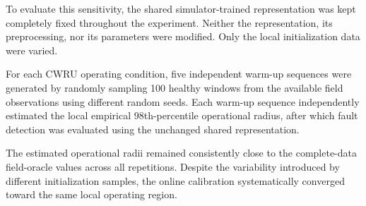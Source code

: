 \documentclass[11pt,a4paper]{article}
\begin{document}
To evaluate this sensitivity, the shared simulator-trained representation was kept completely
fixed throughout the experiment. Neither the representation, its preprocessing, nor its
parameters were modified. Only the local initialization data were varied.

For each CWRU operating condition, five independent warm-up sequences were generated by randomly
sampling 100 healthy windows from the available field observations using different random seeds.
Each warm-up sequence independently estimated the local empirical 98th-percentile operational
radius, after which fault detection was evaluated using the unchanged shared representation.

\begin{table}[H]
\centering
\caption{Robustness of online operational-radius estimation under different random warm-up samples. The shared simulator-trained representation remained fixed throughout the experiment. Only the 100 healthy initialization windows used for local calibration were randomly changed. Values are mean $\pm$ standard deviation over five random seeds.}
\label{tab:initialization-robustness}
\end{table}

The estimated operational radii remained consistently close to the complete-data field-oracle
values across all repetitions. Despite the variability introduced by different initialization
samples, the online calibration systematically converged toward the same local operating region.
\end{document}
